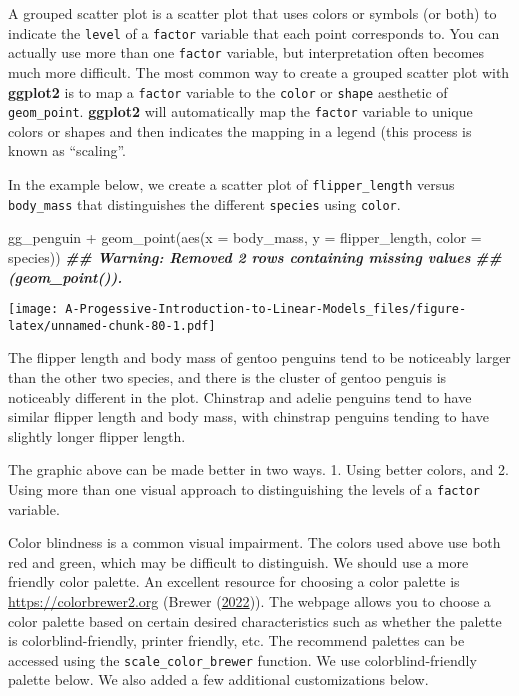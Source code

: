 \documentclass[
]{book}
\newenvironment{Shaded}{\begin{snugshade}}{\end{snugshade}}
\newcommand{\AttributeTok}[1]{\textcolor[rgb]{0.77,0.63,0.00}{#1}}
\newcommand{\DocumentationTok}[1]{\textcolor[rgb]{0.56,0.35,0.01}{\textbf{\textit{#1}}}}
\newcommand{\FunctionTok}[1]{\textcolor[rgb]{0.00,0.00,0.00}{#1}}
\newcommand{\NormalTok}[1]{#1}
\newcommand{\SpecialCharTok}[1]{\textcolor[rgb]{0.00,0.00,0.00}{#1}}
\theoremstyle{definition}
\theoremstyle{definition}
\theoremstyle{definition}
\theoremstyle{definition}
\theoremstyle{remark}
\begin{document}
A grouped scatter plot is a scatter plot that uses colors or symbols (or both) to indicate the \texttt{level} of a \texttt{factor} variable that each point corresponds to. You can actually use more than one \texttt{factor} variable, but interpretation often becomes much more difficult. The most common way to create a grouped scatter plot with \textbf{ggplot2} is to map a \texttt{factor} variable to the \texttt{color} or \texttt{shape} aesthetic of \texttt{geom\_point}. \textbf{ggplot2} will automatically map the \texttt{factor} variable to unique colors or shapes and then indicates the mapping in a legend (this process is known as ``scaling''.

In the example below, we create a scatter plot of \texttt{flipper\_length} versus \texttt{body\_mass} that distinguishes the different \texttt{species} using \texttt{color}.

\begin{Shaded}
\begin{Highlighting}[]
\NormalTok{gg\_penguin }\SpecialCharTok{+} \FunctionTok{geom\_point}\NormalTok{(}\FunctionTok{aes}\NormalTok{(}\AttributeTok{x =}\NormalTok{ body\_mass, }\AttributeTok{y =}\NormalTok{ flipper\_length,}
                            \AttributeTok{color =}\NormalTok{ species))}
\DocumentationTok{\#\# Warning: Removed 2 rows containing missing values}
\DocumentationTok{\#\# (\textasciigrave{}geom\_point()\textasciigrave{}).}
\end{Highlighting}
\end{Shaded}

\texttt{[image: A-Progessive-Introduction-to-Linear-Models\_files/figure-latex/unnamed-chunk-80-1.pdf]}

The flipper length and body mass of gentoo penguins tend to be noticeably larger than the other two species, and there is the cluster of gentoo penguis is noticeably different in the plot. Chinstrap and adelie penguins tend to have similar flipper length and body mass, with chinstrap penguins tending to have slightly longer flipper length.

The graphic above can be made better in two ways. 1. Using better colors, and 2. Using more than one visual approach to distinguishing the levels of a \texttt{factor} variable.

Color blindness is a common visual impairment. The colors used above use both red and green, which may be difficult to distinguish. We should use a more friendly color palette. An excellent resource for choosing a color palette is \url{https://colorbrewer2.org} (Brewer (\protect\hyperlink{ref-brewer}{2022})). The webpage allows you to choose a color palette based on certain desired characteristics such as whether the palette is colorblind-friendly, printer friendly, etc. The recommend palettes can be accessed using the \texttt{scale\_color\_brewer} function. We use colorblind-friendly palette below. We also added a few additional customizations below.
\end{document}
